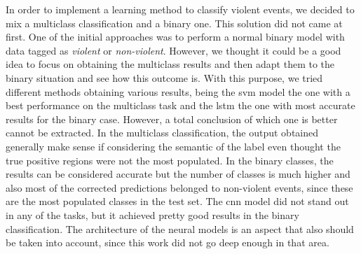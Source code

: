 	In order to implement a learning method to classify violent events, we decided to mix a multiclass classification and a binary one. This solution did not came at first. One of the initial approaches was to perform a normal binary model with data tagged as \textit{violent} or \textit{non-violent}. However, we thought it could be a good idea to focus on obtaining the multiclass results and then adapt them to the binary situation and see how this outcome is. With this purpose, we tried different methods obtaining various results, being the \acrshort{svm} model the one with a best performance on the multiclass task and the \acrshort{lstm} the one with most accurate results for the binary case. However, a total conclusion of which one is better cannot be extracted. In the multiclass classification, the output obtained generally make sense if considering the semantic of the label even thought the true positive regions were not the most populated. In the binary classes, the results can be considered accurate but the number of classes is much higher and also most of the corrected predictions belonged to non-violent events, since these are the most populated classes in the test set. The \acrshort{cnn} model did not stand out in any of the tasks, but it achieved pretty good results in the binary classification. The architecture of the neural models is an aspect that also should be taken into account, since this work did not go deep enough in that area.
